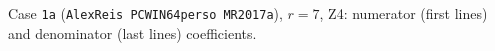 \begin{table}[H]
$$ $$\normalsize \caption{Case \texttt{1a} (\texttt{AlexReis PCWIN64perso MR2017a}), $r=7$, Z4: numerator (first lines) and denominator (last lines) coefficients.} \label{tab:sym-1a-r7-AlexReis_PCWIN64perso_MR2017a} \end{table}
